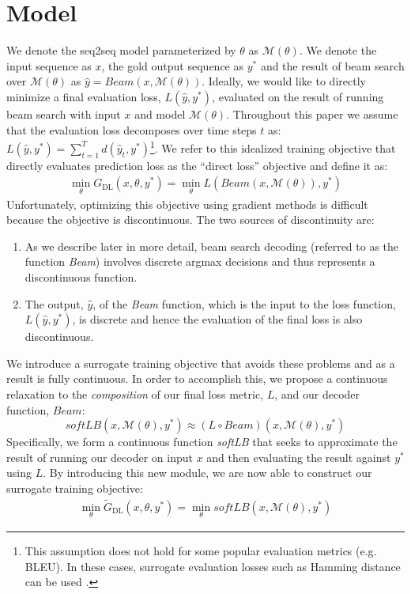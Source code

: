 \documentclass[letterpaper]{article} \usepackage{aaai18}  \usepackage{times}  \usepackage{helvet}  \usepackage{courier}  \usepackage{url}  \usepackage{graphicx}  \frenchspacing
\begin{document}
\section{Model}

We denote the seq2seq model parameterized by $\theta$ as $\mathcal{M}(\theta)$. We denote the input sequence as $x$, the gold output sequence as $y^*$ and the result of beam search over $\mathcal{M}(\theta)$ as $\hat{y} = \textit{Beam}(x,\mathcal{M}(\theta))$. Ideally, we would like to directly minimize a final evaluation loss, $L(\hat{y},y^*)$, evaluated on the result of running beam search with input $x$ and model $\mathcal{M}(\theta)$. Throughout this paper we assume that the evaluation loss decomposes over time steps $t$ as: $L(\hat{y},y^*)=\sum_{t=1}^T d(\hat{y}_t,y^*)$\footnote{This assumption does not hold  for some popular evaluation metrics (e.g. BLEU). In these cases, surrogate evaluation losses such as Hamming distance can be used
.}. 
We refer to this idealized training objective that directly evaluates prediction loss as the ``direct loss'' objective and define it as:
\begin{align}
\min_{\theta} G_{\textrm{DL}}(x,\theta,y^*) = \min_{\theta} L(\textit{Beam}(x,\mathcal{M}(\theta)),y^*)
\end{align}
Unfortunately, optimizing this objective using gradient methods is difficult because the objective is discontinuous. The two sources of discontinuity are:
\begin{enumerate}
\item As we describe later in more detail, beam search decoding (referred to as the function \textit{Beam}) involves discrete argmax decisions and thus represents a discontinuous function.
\item The output, $\hat{y}$, of the \textit{Beam} function, which is the input to the loss function, $L(\hat{y},y^*)$, is discrete and hence the evaluation of the final loss is also discontinuous.
\end{enumerate}
We introduce a surrogate training objective that avoids these problems and as a result is fully continuous. In order to accomplish this, we propose a continuous relaxation to the \emph{composition} of our final loss metric, $L$, and our decoder function, $Beam$:
\[
\textit{softLB}(x, \mathcal{M}(\theta), y^*) \approx (L \circ Beam)(x, \mathcal{M}(\theta), y^*)
\]
Specifically, we form a continuous function \textit{softLB} that seeks to approximate the result of running our decoder on input $x$ and then evaluating the result against $y^*$ using $L$.
By introducing this new module, we are now able to construct our surrogate training objective:
\begin{align}
\min_\theta \tilde{G}_{\textrm{DL}}(x,\theta,y^*) = \min_\theta \textit{softLB}(x, \mathcal{M}(\theta), y^*)
\end{align}
\end{document}
